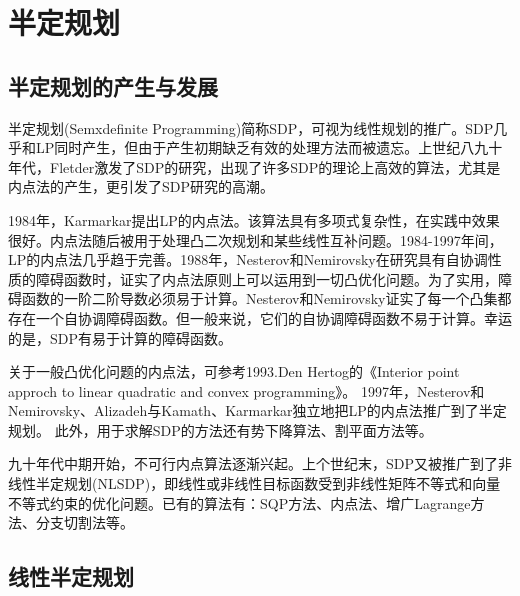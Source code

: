 
\chapter{半定规划}
\section{半定规划的产生与发展}
    \par
    半定规划(Semxdefinite Programming)简称SDP，可视为线性规划的推广。SDP几乎和LP同时产生，但由于产生初期缺乏有效的处理方法而被遗忘。上世纪八九十年代，Fletder激发了SDP的研究，出现了许多SDP的理论上高效的算法，尤其是内点法的产生，更引发了SDP研究的高潮。
    \par
    1984年，Karmarkar提出LP的内点法。该算法具有多项式复杂性，在实践中效果很好。内点法随后被用于处理凸二次规划和某些线性互补问题。1984-1997年间，LP的内点法几乎趋于完善。1988年，Nesterov和Nemirovsky在研究具有自协调性质的障碍函数时，证实了内点法原则上可以运用到一切凸优化问题。为了实用，障碍函数的一阶二阶导数必须易于计算。Nesterov和Nemirovsky证实了每一个凸集都存在一个自协调障碍函数。但一般来说，它们的自协调障碍函数不易于计算。幸运的是，SDP有易于计算的障碍函数。
    \par
    关于一般凸优化问题的内点法，可参考1993.Den Hertog的《Interior point approch to linear quadratic and convex programming》。
    1997年，Nesterov和Nemirovsky、Alizadeh与Kamath、Karmarkar独立地把LP的内点法推广到了半定规划。
    此外，用于求解SDP的方法还有势下降算法、割平面方法等。
    \par
    九十年代中期开始，不可行内点算法逐渐兴起。上个世纪末，SDP又被推广到了非线性半定规划(NLSDP)，即线性或非线性目标函数受到非线性矩阵不等式和向量不等式约束的优化问题。已有的算法有：SQP方法、内点法、增广Lagrange方法、分支切割法等。
\section{线性半定规划}

